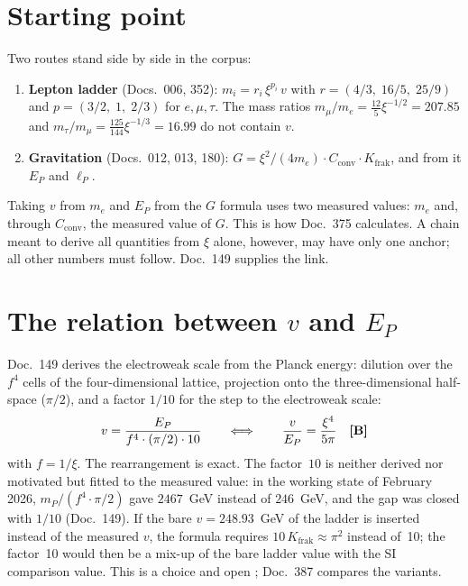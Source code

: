 \section{Starting point}
Two routes stand side by side in the corpus:
\begin{enumerate}
\item \textbf{Lepton ladder} (Docs.~006, 352): $m_i=r_i\,\xi^{p_i}\,v$ with
  $r=(4/3,\;16/5,\;25/9)$ and $p=(3/2,\;1,\;2/3)$ for $e,\mu,\tau$. The mass ratios
  $m_\mu/m_e=\tfrac{12}{5}\xi^{-1/2}=207.85$ and
  $m_\tau/m_\mu=\tfrac{125}{144}\xi^{-1/3}=16.99$ do not contain $v$.
\item \textbf{Gravitation} (Docs.~012, 013, 180):
  $G=\xi^2/(4m_e)\cdot C_{\text{conv}}\cdot K_{\text{frak}}$, and from it $E_P$ and $\ell_P$.
\end{enumerate}
Taking $v$ from $m_e$ and $E_P$ from the $G$ formula uses two measured values: $m_e$
and, through $C_{\text{conv}}$, the measured value of $G$. This is how Doc.~375
calculates. A chain meant to derive all quantities from $\xi$ alone, however, may have
only one anchor; all other numbers must follow. Doc.~149 supplies the link.

\section{The relation between \texorpdfstring{$v$}{v} and \texorpdfstring{$E_P$}{E\_P}}
Doc.~149 derives the electroweak scale from the Planck energy: dilution over the $f^4$
cells of the four-dimensional lattice, projection onto the three-dimensional half-space
($\pi/2$), and a factor $1/10$ for the step to the electroweak scale:
\begin{equation}
  v=\frac{E_P}{f^4\cdot(\pi/2)\cdot10}
  \qquad\Longleftrightarrow\qquad
  \frac{v}{E_P}=\frac{\xi^4}{5\pi}\quad\textbf{[B]}
\end{equation}
with $f=1/\xi$. The rearrangement is exact. The factor~$10$ is neither derived nor
motivated but fitted to the measured value: in the working state of February 2026,
$m_P/(f^4\cdot\pi/2)$ gave $2467$~GeV instead of $246$~GeV, and the gap was closed with
$1/10$ (Doc.~149). If the bare $v=248.93$~GeV of the ladder is inserted instead of the
measured $v$, the formula requires $10\,K_{\text{frak}}\approx\pi^2$ instead of~10; the
factor~10 would then be a mix-up of the bare ladder value with the SI comparison value.
This is a choice and open \SM; Doc.~387 compares the variants.

